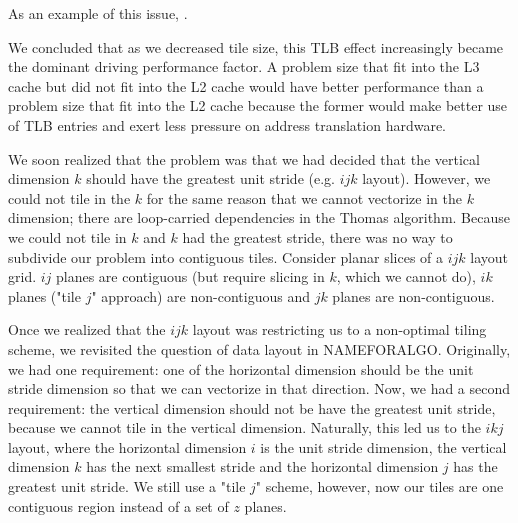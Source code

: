 \documentclass[conference]{IEEEtran}
\begin{document}
As an example of this issue, .

We concluded that as we decreased tile size, this TLB effect increasingly
became the dominant driving performance factor. A problem size that fit into
the L3 cache but did not fit into the L2 cache would have better performance
than a problem size that fit into the L2 cache because the former would make
better use of TLB entries and exert less pressure on address translation
hardware.

We soon realized that the problem was that we had decided that the
vertical dimension \(k\) should have the greatest unit stride (e.g. \(ijk\)
layout). However, we could not tile in the \(k\) for the same reason that we
cannot vectorize in the \(k\) dimension; there are loop-carried dependencies in
the Thomas algorithm. Because we could not tile in \(k\) and \(k\) had the greatest
stride, there was no way to subdivide our problem into contiguous tiles.
Consider planar slices of a \(ijk\) layout grid. \(ij\) planes are contiguous
(but require slicing in \(k\), which we cannot do), \(ik\) planes ("tile \(j\)"
approach) are non-contiguous and \(jk\) planes are non-contiguous.

Once we realized that the \(ijk\) layout was restricting us to a non-optimal
tiling scheme, we revisited the question of data layout in NAMEFORALGO.
Originally, we had one requirement: one of the horizontal dimension should be
the unit stride dimension so that we can vectorize in that direction. Now, we
had a second requirement: the vertical dimension should not be have the
greatest unit stride, because we cannot tile in the vertical dimension.
Naturally, this led us to the \(ikj\) layout, where the horizontal dimension
\(i\) is the unit stride dimension, the vertical dimension \(k\) has the next
smallest stride and the horizontal dimension \(j\) has the greatest unit
stride. We still use a "tile \(j\)" scheme, however, now our tiles are one
contiguous region instead of a set of \(z\) planes.

\end{document}
